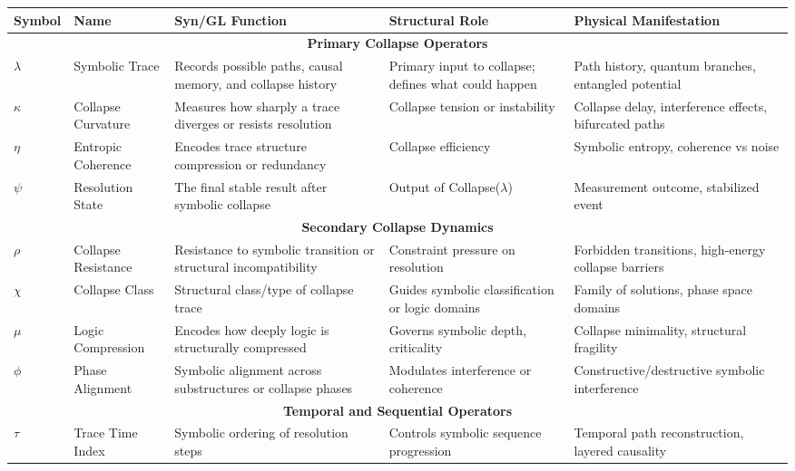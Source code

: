 \documentclass[11pt]{article}
\begin{document}
\begin{table}[H]
\centering
\renewcommand{\arraystretch}{1.4}
\begin{tabular}{|p{1.5cm}|p{3cm}|p{4cm}|p{4cm}|p{4cm}|}
\hline
\textbf{Symbol} & \textbf{Name} & \textbf{Syn/GL Function} & \textbf{Structural Role} & \textbf{Physical Manifestation} \\
\hline
\multicolumn{5}{|c|}{\textbf{Primary Collapse Operators}} \\
\hline
$\lambda$ & Symbolic Trace & Records possible paths, causal memory, and collapse history & Primary input to collapse; defines what could happen & Path history, quantum branches, entangled potential \\
\hline
$\kappa$ & Collapse Curvature & Measures how sharply a trace diverges or resists resolution & Collapse tension or instability & Collapse delay, interference effects, bifurcated paths \\
\hline
$\eta$ & Entropic Coherence & Encodes trace structure compression or redundancy & Collapse efficiency & Symbolic entropy, coherence vs noise \\
\hline
$\psi$ & Resolution State & The final stable result after symbolic collapse & Output of Collapse($\lambda$) & Measurement outcome, stabilized event \\
\hline
\multicolumn{5}{|c|}{\textbf{Secondary Collapse Dynamics}} \\
\hline
$\rho$ & Collapse Resistance & Resistance to symbolic transition or structural incompatibility & Constraint pressure on resolution & Forbidden transitions, high-energy collapse barriers \\
\hline
$\chi$ & Collapse Class & Structural class/type of collapse trace & Guides symbolic classification or logic domains & Family of solutions, phase space domains \\
\hline
$\mu$ & Logic Compression & Encodes how deeply logic is structurally compressed & Governs symbolic depth, criticality & Collapse minimality, structural fragility \\
\hline
$\phi$ & Phase Alignment & Symbolic alignment across substructures or collapse phases & Modulates interference or coherence & Constructive/destructive symbolic interference \\
\hline
\multicolumn{5}{|c|}{\textbf{Temporal and Sequential Operators}} \\
\hline
$\tau$ & Trace Time Index & Symbolic ordering of resolution steps & Controls symbolic sequence progression & Temporal path reconstruction, layered causality \\

\end{tabular}
\end{table}
\end{document}
